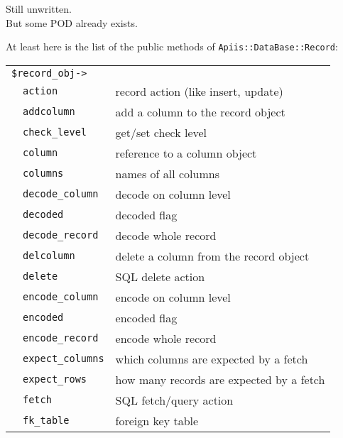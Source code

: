 
Still unwritten. \frownie \\
But some POD already exists. \smiley

At least here is the list of the public methods of
\verb+Apiis::DataBase::Record+:

\smallskip
\begin{tabular}{rl|l}
\multicolumn{3}{l}{\texttt{\$record\_obj->}}       \\
               &\verb+action+               & record action (like insert, update) \\
               &\verb+addcolumn+            & add a column to the record object \\
               &\verb+check_level+          & get/set check level \\
               &\verb+column+               & reference to a column object \\
               &\verb+columns+              & names of all columns \\
               &\verb+decode_column+        & decode on column level \\
               &\verb+decoded+              & decoded flag \\
               &\verb+decode_record+        & decode whole record \\
               &\verb+delcolumn+            & delete a column from the record object \\
               &\verb+delete+               & SQL delete action \\
               &\verb+encode_column+        & encode on column level \\
               &\verb+encoded+              & encoded flag \\
               &\verb+encode_record+        & encode whole record \\
               &\verb+expect_columns+       & which columns are expected by a fetch \\
               &\verb+expect_rows+          & how many records are expected by a fetch \\
               &\verb+fetch+                & SQL fetch/query action \\
               &\verb+fk_table+             & foreign key table \\

\end{tabular}
